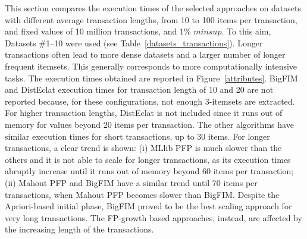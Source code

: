 This section compares the execution times of the selected approaches
on datasets with different average transaction lengths,
from 10 to 100 items per transaction,
and fixed values of 10 million transactions, and 1\% $minsup$.
To this aim, Datasets \#1--10 were used (see Table~\ref{datasets_transactions}).
Longer transactions often lead to more dense datasets and a larger number of longer frequent itemsets.
This generally corresponds to more computationally intensive tasks.
The execution times obtained are reported in Figure~\ref{attributes}.
BigFIM and DistEclat execution times for transaction length of 10 and 20 are not reported because, for these configurations, not enough 3-itemsets are extracted.
For higher transaction lengths, DistEclat is not included since it runs out of memory
for values beyond 20 items per transaction.
The other algorithms have similar execution times for short transactions,
up to 30 items.
For longer transactions, a clear trend is shown:
(i) MLlib PFP is much slower than the others
and it is not able to scale for longer transactions,
as its execution times abruptly increase until it runs out of memory
beyond 60 items per transaction;
(ii) Mahout PFP and BigFIM have a similar trend until 70 items per transactions,
when Mahout PFP becomes slower than BigFIM.
Despite the Apriori-based initial phase,
BigFIM proved to be the best scaling approach for very long transactions.
The FP-growth based approaches, instead,
are affected by the increasing length of the transactions.


%
%


